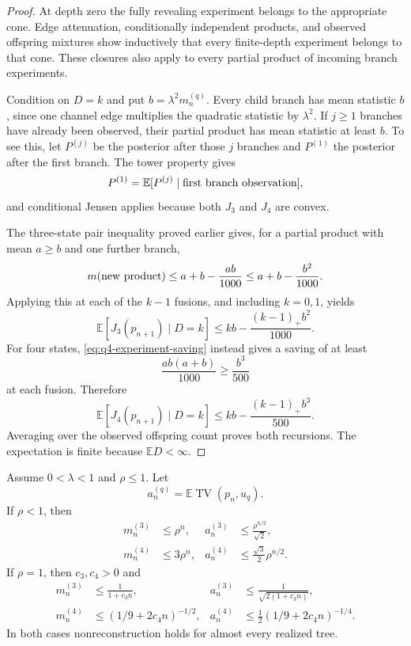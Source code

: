 \begin{proof}
At depth zero the fully revealing experiment belongs to the appropriate
cone.  Edge attenuation, conditionally independent products, and observed
offspring mixtures show inductively that every finite-depth experiment
belongs to that cone.  These closures also apply to every partial product
of incoming branch experiments.

Condition on $D=k$ and put $b=\lambda^2m_n^{(q)}$.  Every child branch
has mean statistic $b$, since one channel edge multiplies the quadratic
statistic by $\lambda^2$.  If $j\ge1$ branches have already been observed,
their partial product has mean statistic at least $b$.  To see this,
let $P^{(j)}$ be the posterior after those $j$ branches and $P^{(1)}$ the
posterior after the first branch.  The tower property gives
\[
 P^{(1)}=\mathbb E[P^{(j)}\mid\hbox{first branch observation}],
\]
and conditional Jensen applies because both $J_3$ and $J_4$ are convex.

The three-state pair inequality proved earlier gives, for a partial
product with mean $a\ge b$ and one further branch,
\[
 m(\hbox{new product})\le a+b-\frac{ab}{1000}
 \le a+b-\frac{b^2}{1000}.
\]
Applying this at each of the $k-1$ fusions, and including $k=0,1$, yields
\[
 \mathbb E[J_3(p_{n+1})\mid D=k]
 \le kb-\frac{(k-1)_+b^2}{1000}.
\]
For four states, \eqref{eq:q4-experiment-saving} instead gives a saving
of at least
\[
 \frac{ab(a+b)}{1000}\ge\frac{b^3}{500}
\]
at each fusion.  Therefore
\[
 \mathbb E[J_4(p_{n+1})\mid D=k]
 \le kb-\frac{(k-1)_+b^3}{500}.
\]
Averaging over the observed offspring count proves both recursions.
The expectation is finite because $\mathbb E D<\infty$.
\end{proof}

\begin{proposition}
\label{prop:gw-decay}
Assume $0<\lambda<1$ and $\rho\le1$.  Let
\[
 a_n^{(q)}=\mathbb E\operatorname{TV}(p_n,u_q).
\]
If $\rho<1$, then
\begin{align}
 m_n^{(3)}&\le\rho^n,
 &a_n^{(3)}&\le\frac{\rho^{n/2}}{\sqrt2},
 \label{eq:q3-subcritical-rate}\\
 m_n^{(4)}&\le3\rho^n,
 &a_n^{(4)}&\le\frac{\sqrt3}{2}\rho^{n/2}.
 \label{eq:q4-subcritical-rate}
\end{align}
If $\rho=1$, then $c_3,c_4>0$ and
\begin{align}
 m_n^{(3)}&\le\frac1{1+c_3n},
 &a_n^{(3)}&\le\frac1{\sqrt{2(1+c_3n)}},
 \label{eq:q3-critical-rate}\\
 m_n^{(4)}&\le(1/9+2c_4n)^{-1/2},
 &a_n^{(4)}&\le\frac12(1/9+2c_4n)^{-1/4}.
 \label{eq:q4-critical-rate}
\end{align}
In both cases nonreconstruction holds for almost every realized tree.
\end{proposition}

